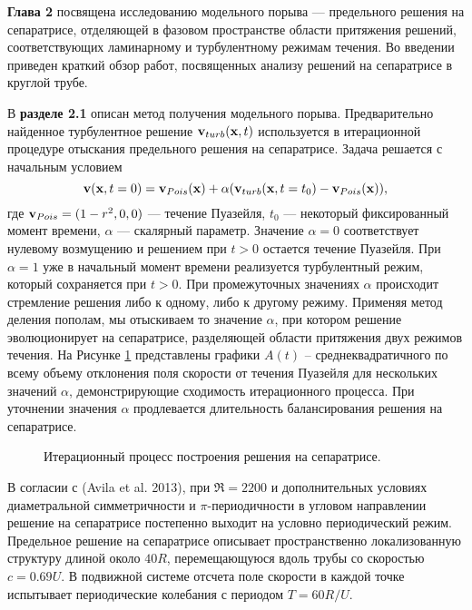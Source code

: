 \textbf{Глава 2} посвящена исследованию модельного порыва --- предельного решения на сепаратрисе, отделяющей в фазовом пространстве области притяжения решений, соответствующих ламинарному и турбулентному режимам течения. Во введении приведен краткий обзор работ, посвященных анализу решений на сепаратрисе в круглой трубе. 

В \textbf{разделе 2.1} описан метод получения модельного порыва. Предварительно найденное турбулентное решение $\mathbf{v}_{turb}(\mathbf{x},t)$ используется в итерационной процедуре отыскания предельного решения на сепаратрисе. Задача решается с начальным условием
\begin{equation} \label{edge_init_eq}
\mathbf{v}(\mathbf{x},t=0) = \mathbf{v}_{Pois}(\mathbf{x})+\alpha(\mathbf{v}_{turb}(\mathbf{x},t=t_0) - \mathbf{v}_{Pois}(\mathbf{x})),
\end{equation}
где $\mathbf{v}_{Pois}=(1-r^2,0,0)$ --- течение Пуазейля, $t_0$ --- некоторый фиксированный момент времени, $\alpha$ --- скалярный параметр. Значение $\alpha=0$ соответствует нулевому возмущению и решением при $t > 0$ остается течение Пуазейля. При $\alpha=1$ уже в начальный момент времени реализуется турбулентный режим, который сохраняется при $t > 0$. При промежуточных значениях $\alpha$ происходит стремление решения либо к одному, либо к другому режиму. Применяя метод деления пополам, мы отыскиваем то значение $\alpha$, при котором решение эволюционирует на сепаратрисе, разделяющей области притяжения двух режимов течения. На Рисунке \ref{bisection_pic} представлены графики $A(t)$ – среднеквадратичного по всему объему отклонения поля скорости от течения Пуазейля для нескольких значений $\alpha$, демонстрирующие сходимость итерационного процесса. При уточнении значения $\alpha$ продлевается длительность балансирования решения на сепаратрисе.

\begin{figure}
\caption{Итерационный процесс построения решения на сепаратрисе.}
\label{bisection_pic}
\end{figure}

В согласии с (Avila et al. 2013), при $\Re=2200$ и дополнительных условиях диаметральной симметричности и $\pi$-периодичности в угловом направлении решение на сепаратрисе постепенно выходит на условно периодический режим. Предельное решение на сепаратрисе описывает пространственно локализованную структуру длиной около $40R$, перемещающуюся вдоль трубы со скоростью $c=0.69U$. В подвижной системе отсчета поле скорости в каждой точке испытывает периодические колебания с периодом $T=60R/U$. 

